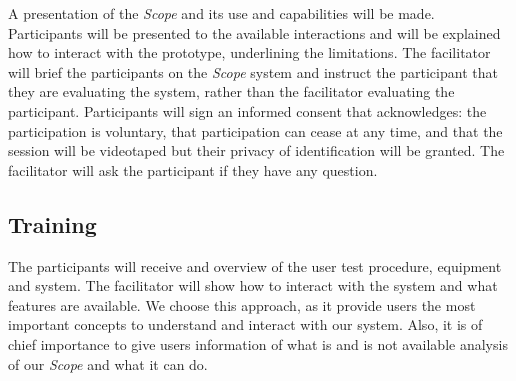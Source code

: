 A presentation of the \textit{Scope} and its use and capabilities will be made. Participants will be presented to the available interactions and will be explained how to interact with the prototype, underlining the limitations. The facilitator will brief the participants on the \textit{Scope} system and instruct the participant that they are evaluating the system, rather than the facilitator evaluating the participant. Participants will sign an informed consent that acknowledges: the participation is voluntary, that participation can cease at any time, and that the session will be videotaped but their privacy of identification will be granted. The facilitator will ask the participant if they have any question.



\subsection{Training}

The participants will receive and overview of the user test procedure, equipment and system. The facilitator will show how to interact with the system and what features are available. We choose this approach, as it provide users the most important concepts to understand and interact with our system. Also, it is of chief importance to give users information of what is and is not available analysis of our \textit{Scope} and what it can do.


\clearpage